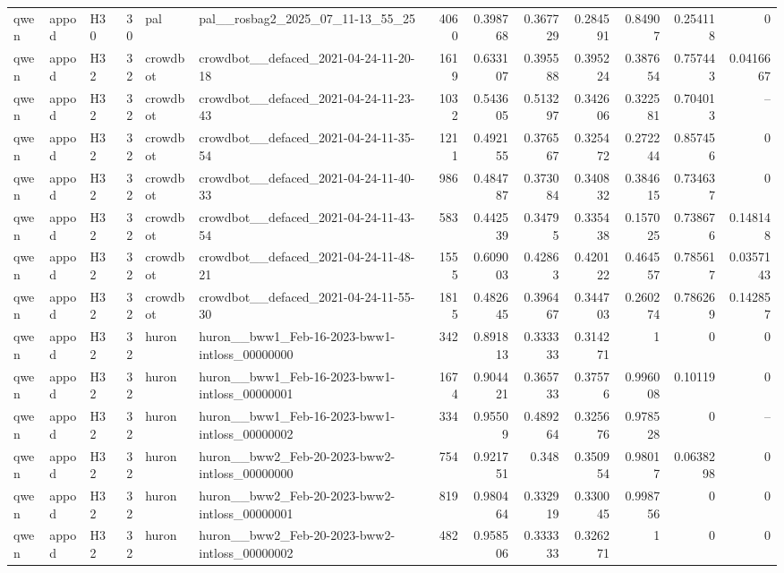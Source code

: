 \begin{longtable}{lllrllrrrrrrr}
qwen & appod & H30 & 30 & pal & pal\_\_rosbag2\_2025\_07\_11-13\_55\_25 & 4060 & 0.398768 & 0.367729 & 0.284591 & 0.84907 & 0.254118 & 0 \\
qwen & appod & H32 & 32 & crowdbot & crowdbot\_\_defaced\_2021-04-24-11-20-18 & 1619 & 0.633107 & 0.395588 & 0.395224 & 0.387654 & 0.757443 & 0.0416667 \\
qwen & appod & H32 & 32 & crowdbot & crowdbot\_\_defaced\_2021-04-24-11-23-43 & 1032 & 0.543605 & 0.513297 & 0.342606 & 0.322581 & 0.704013 & -- \\
qwen & appod & H32 & 32 & crowdbot & crowdbot\_\_defaced\_2021-04-24-11-35-54 & 1211 & 0.492155 & 0.376567 & 0.325472 & 0.272244 & 0.857456 & 0 \\
qwen & appod & H32 & 32 & crowdbot & crowdbot\_\_defaced\_2021-04-24-11-40-33 & 986 & 0.484787 & 0.373084 & 0.340832 & 0.384615 & 0.734637 & 0 \\
qwen & appod & H32 & 32 & crowdbot & crowdbot\_\_defaced\_2021-04-24-11-43-54 & 583 & 0.442539 & 0.34795 & 0.335438 & 0.157025 & 0.738676 & 0.148148 \\
qwen & appod & H32 & 32 & crowdbot & crowdbot\_\_defaced\_2021-04-24-11-48-21 & 1555 & 0.609003 & 0.42863 & 0.420122 & 0.464557 & 0.785617 & 0.0357143 \\
qwen & appod & H32 & 32 & crowdbot & crowdbot\_\_defaced\_2021-04-24-11-55-30 & 1815 & 0.482645 & 0.396467 & 0.344703 & 0.260274 & 0.786269 & 0.142857 \\
qwen & appod & H32 & 32 & huron & huron\_\_bww1\_Feb-16-2023-bww1-intloss\_00000000 & 342 & 0.891813 & 0.333333 & 0.314271 & 1 & 0 & 0 \\
qwen & appod & H32 & 32 & huron & huron\_\_bww1\_Feb-16-2023-bww1-intloss\_00000001 & 1674 & 0.904421 & 0.365733 & 0.37576 & 0.996008 & 0.10119 & 0 \\
qwen & appod & H32 & 32 & huron & huron\_\_bww1\_Feb-16-2023-bww1-intloss\_00000002 & 334 & 0.95509 & 0.489264 & 0.325676 & 0.978528 & 0 & -- \\
qwen & appod & H32 & 32 & huron & huron\_\_bww2\_Feb-20-2023-bww2-intloss\_00000000 & 754 & 0.921751 & 0.348 & 0.350954 & 0.98017 & 0.0638298 & 0 \\
qwen & appod & H32 & 32 & huron & huron\_\_bww2\_Feb-20-2023-bww2-intloss\_00000001 & 819 & 0.980464 & 0.332919 & 0.330045 & 0.998756 & 0 & 0 \\
qwen & appod & H32 & 32 & huron & huron\_\_bww2\_Feb-20-2023-bww2-intloss\_00000002 & 482 & 0.958506 & 0.333333 & 0.326271 & 1 & 0 & 0 \\

\end{longtable}
